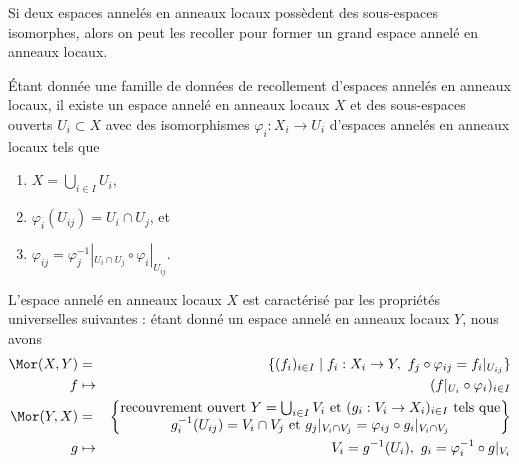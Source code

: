 \begin{lemma}
\label{lemma-glue}
\begin{slogan}
Si deux espaces annelés en anneaux locaux possèdent des sous-espaces
isomorphes, alors on peut les recoller pour former un grand
espace annelé en anneaux locaux.
\end{slogan}
Étant donnée une famille de données de recollement d'espaces annelés en
anneaux locaux, il existe un espace annelé en anneaux locaux $X$ et
des sous-espaces ouverts $U_i \subset X$ avec des
isomorphismes $\varphi_i : X_i \to U_i$ d'espaces annelés en anneaux locaux tels que
\begin{enumerate}
\item $X=\bigcup_{i\in I} U_i$,
\item $\varphi_i(U_{ij}) = U_i \cap U_j$, et
\item $\varphi_{ij} =
\varphi_j^{-1}|_{U_i \cap U_j} \circ \varphi_i|_{U_{ij}}$.
\end{enumerate}
L'espace annelé en anneaux locaux $X$ est caractérisé par les propriétés universelles
suivantes : étant donné un espace annelé en anneaux locaux $Y$, nous avons
\begin{eqnarray*}
\Mor(X, Y) & = & \{ (f_i)_{i\in I} \mid
f_i : X_i \to Y, \ f_j \circ \varphi_{ij} = f_i|_{U_{ij}}\} \\ f
& \mapsto & (f|_{U_i} \circ \varphi_i)_{i \in I} \\
\Mor(Y, X) & = &
\left\{
\begin{matrix}
\text{recouvrement ouvert }Y = \bigcup\nolimits_{i \in I} V_i\text{ et
} (g_i : V_i \to X_i)_{i \in
I} \text{ tels que}\\
g_i^{-1}(U_{ij}) = V_i \cap V_j
\text{ et
} g_j|_{V_i \cap V_j} = \varphi_{ij} \circ g_i|_{V_i \cap V_j}
\end{matrix}
\right\} \\
g & \mapsto &
V_i = g^{-1}(U_i), \ g_i = \varphi_i^{-1} \circ g|_{V_i}
\end{eqnarray*}
\end{lemma}

